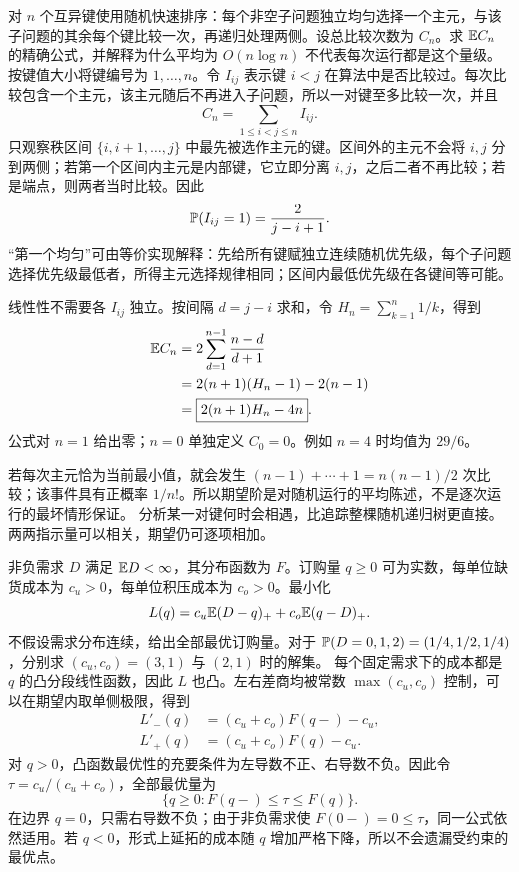 对 $n$ 个互异键使用随机快速排序：每个非空子问题独立均匀选择一个主元，与该子问题的其余每个键比较一次，再递归处理两侧。设总比较次数为 $C_n$。求 $\mathbb{E} C_n$ 的精确公式，并解释为什么平均为 $O(n\log n)$ 不代表每次运行都是这个量级。
\solution 按键值大小将键编号为 $1,\ldots,n$。令 $I_{ij}$ 表示键 $i<j$ 在算法中是否比较过。每次比较包含一个主元，该主元随后不再进入子问题，所以一对键至多比较一次，并且
\[
C_n=\sum_{1\le i<j\le n}I_{ij}.
\]
只观察秩区间 $\{i,i+1,\ldots,j\}$ 中最先被选作主元的键。区间外的主元不会将 $i,j$ 分到两侧；若第一个区间内主元是内部键，它立即分离 $i,j$，之后二者不再比较；若是端点，则两者当时比较。因此
\[
\mathbb{P}(I_{ij}=1)=\frac2{j-i+1}.
\]
“第一个均匀”可由等价实现解释：先给所有键赋独立连续随机优先级，每个子问题选择优先级最低者，所得主元选择规律相同；区间内最低优先级在各键间等可能。

线性性不需要各 $I_{ij}$ 独立。按间隔 $d=j-i$ 求和，令 $H_n=\sum_{k=1}^n1/k$，得到
\[
\begin{aligned}
\mathbb{E} C_n
&=2\sum_{d=1}^{n-1}\frac{n-d}{d+1}\\
&=2(n+1)(H_n-1)-2(n-1)\\
&=\boxed{2(n+1)H_n-4n}.
\end{aligned}
\]
公式对 $n=1$ 给出零；$n=0$ 单独定义 $C_0=0$。例如 $n=4$ 时均值为 $29/6$。

若每次主元恰为当前最小值，就会发生 $(n-1)+\cdots+1=n(n-1)/2$ 次比较；该事件具有正概率 $1/n!$。所以期望阶是对随机运行的平均陈述，不是逐次运行的最坏情形保证。
\insight 分析某一对键何时会相遇，比追踪整棵随机递归树更直接。两两指示量可以相关，期望仍可逐项相加。

非负需求 $D$ 满足 $\mathbb{E} D<\infty$，其分布函数为 $F$。订购量 $q\ge0$ 可为实数，每单位缺货成本为 $c_u>0$，每单位积压成本为 $c_o>0$。最小化
\[
L(q)=c_u\mathbb{E}(D-q)_++c_o\mathbb{E}(q-D)_+.
\]
不假设需求分布连续，给出全部最优订购量。对于 $\mathbb{P}(D=0,1,2)=(1/4,1/2,1/4)$，分别求 $(c_u,c_o)=(3,1)$ 与 $(2,1)$ 时的解集。
\solution 每个固定需求下的成本都是 $q$ 的凸分段线性函数，因此 $L$ 也凸。左右差商均被常数 $\max(c_u,c_o)$ 控制，可以在期望内取单侧极限，得到
\[
\begin{aligned}
L'_-(q)&=(c_u+c_o)F(q-)-c_u,\\
L'_+(q)&=(c_u+c_o)F(q)-c_u.
\end{aligned}
\]
对 $q>0$，凸函数最优性的充要条件为左导数不正、右导数不负。因此令 $\tau=c_u/(c_u+c_o)$，全部最优量为
\[
\boxed{\{q\ge0:F(q-)\le\tau\le F(q)\}}.
\]
在边界 $q=0$，只需右导数不负；由于非负需求使 $F(0-)=0\le\tau$，同一公式依然适用。若 $q<0$，形式上延拓的成本随 $q$ 增加严格下降，所以不会遗漏受约束的最优点。

